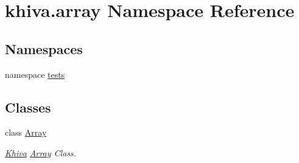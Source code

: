 \hypertarget{namespacekhiva_1_1array}{}\section{khiva.\+array Namespace Reference}
\label{namespacekhiva_1_1array}
\subsection*{Namespaces}
\begin{DoxyCompactItemize}
\item 
namespace \mbox{\hyperlink{namespacekhiva_1_1array_1_1tests}{tests}}
\end{DoxyCompactItemize}
\subsection*{Classes}
\begin{DoxyCompactItemize}
\item 
class \mbox{\hyperlink{classkhiva_1_1array_1_1_array}{Array}}
\begin{DoxyCompactList}\small\item\em \mbox{\hyperlink{classkhiva_1_1_khiva}{Khiva}} \mbox{\hyperlink{classkhiva_1_1array_1_1_array}{Array}} Class. \end{DoxyCompactList}\end{DoxyCompactItemize}
